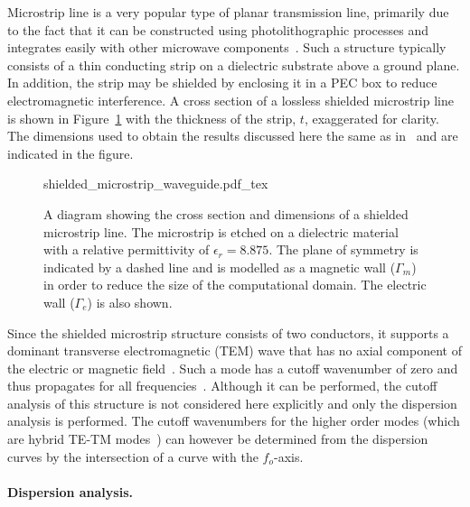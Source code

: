 Microstrip line is a very popular type of planar transmission line,
primarily due to the fact that it can be constructed using
photolithographic processes and integrates easily with other microwave
components~\citep{Pozar2005}. Such a structure typically consists of a
thin conducting strip on a dielectric substrate above a ground
plane. In addition, the strip may be shielded by enclosing it in a PEC
box to reduce electromagnetic interference. A cross section of a
lossless shielded microstrip line is shown in
Figure~\ref{fig:lezar:shielded_microstrip} with the thickness of the
strip, $t$, exaggerated for clarity. The dimensions used to obtain the
results discussed here the same as
in~\citet{PelosiCoccioliSelleri1998} and are indicated in the figure.
\begin{figure}[t]
    \centering
    \def\svgwidth{\smallfig}
    {shielded_microstrip_waveguide.pdf_tex}
    \caption{A diagram showing the cross section and dimensions of a shielded microstrip line. The microstrip is etched on a dielectric material with a relative permittivity of $\epsilon_r = 8.875$. The plane of symmetry is indicated by a dashed line and is modelled as a magnetic wall ($\Gamma_m$) in order to reduce the size of the computational domain. The electric wall ($\Gamma_e$) is also shown.}
    \label{fig:lezar:shielded_microstrip}
\end{figure}

Since the shielded microstrip structure consists of two conductors, it
supports a dominant transverse electromagnetic (TEM) wave that has no
axial component of the electric or magnetic
field~\citep{Pozar2005}. Such a mode has a cutoff
wavenumber of zero and thus propagates for
all frequencies~\citep{Jin2002,PelosiCoccioliSelleri1998}. Although it
can be performed, the cutoff analysis of this structure is not
considered here explicitly and only the dispersion analysis is
performed. The cutoff wavenumbers for the higher order modes (which
are hybrid TE-TM modes~\citep{Pozar2005}) can however be determined
from the dispersion curves by the intersection of a curve with the
$f_o$-axis.

\paragraph{Dispersion analysis.}

